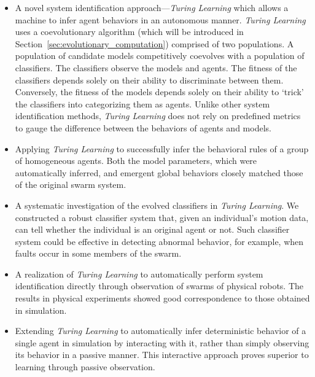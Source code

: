\begin{itemize}

\item A novel system identification approach---\textit{Turing Learning} which allows a machine to infer agent behaviors in an autonomous manner. \textit{Turing Learning} uses a coevolutionary algorithm (which will be introduced in Section~\ref{sec:evolutionary_computation}) comprised of two populations. A population of candidate models competitively coevolves with a population of classifiers. The classifiers observe the models and agents. The fitness of the classifiers depends solely on their ability to discriminate between them. Conversely, the fitness of the models depends solely on their ability to `trick' the classifiers into categorizing them as agents. Unlike other system identification methods, \textit{Turing Learning} does not rely on predefined metrics to gauge the difference between the behaviors of agents and models. 

\item Applying \textit{Turing Learning} to successfully infer the behavioral rules of a group of homogeneous agents. Both the model parameters, which were automatically inferred, and emergent global behaviors closely matched those of the original swarm system. 

\item A systematic investigation of the evolved classifiers in \textit{Turing Learning}. We constructed a robust classifier system that, given an individual's motion data, can tell whether the individual is an original agent or not. Such classifier system could be effective in detecting abnormal behavior, for example, when faults occur in some members of the swarm.

\item A realization of \textit{Turing Learning} to automatically perform system identification directly through observation of swarms of physical robots. The results in physical experiments showed good correspondence to those obtained in simulation. 

\item Extending \textit{Turing Learning} to automatically infer deterministic behavior of a single agent in simulation by interacting with it, rather than simply observing its behavior in a passive manner. This interactive approach proves superior to learning through passive observation. 


\end{itemize}
